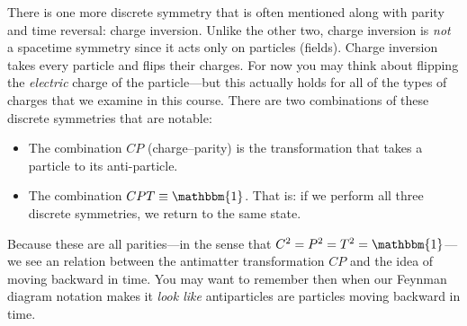 \begin{subappendices}
There is one more discrete symmetry that is often mentioned along with parity and time reversal: charge inversion. Unlike the other two, charge inversion is \emph{not} a spacetime symmetry since it acts only on particles (fields). Charge inversion takes every particle and flips their charges. For now you may think about flipping the \emph{electric} charge of the particle---but this actually holds for all of the types of charges that we examine in this course. There are two combinations of these discrete symmetries that are notable:
\begin{itemize}
    \item The combination $CP$ (charge--parity) is the transformation that takes a particle to its anti-particle.
    \item The combination $CPT \equiv \mathbbm{1}$. That is: if we perform all three discrete symmetries, we return to the same state.%
\end{itemize}
Because these are all parities---in the sense that $C^2 = P^2 = T^2 = \mathbbm{1}$---we see an relation between the antimatter transformation $CP$ and the idea of moving backward in time. You may want to remember then when our Feynman diagram notation makes it \emph{look like} antiparticles are particles moving backward in time.

\end{subappendices}
